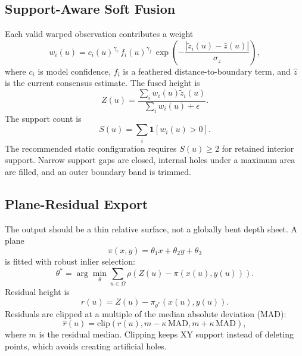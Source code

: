 \documentclass[conference]{IEEEtran}
\begin{document}
\subsection{Support-Aware Soft Fusion}
Each valid warped observation contributes a weight
\begin{equation}
w_i(u)=
c_i(u)^{\gamma_c}\,
f_i(u)^{\gamma_f}\,
\exp\left(-\frac{| \tilde{z}_i(u)-\hat{z}(u)|}{\sigma_z}\right),
\label{eq:fusion_weight}
\end{equation}
where $c_i$ is model confidence, $f_i$ is a feathered distance-to-boundary term, and $\hat{z}$ is the current consensus estimate. The fused height is
\begin{equation}
Z(u)=\frac{\sum_i w_i(u)\tilde{z}_i(u)}{\sum_i w_i(u)+\epsilon}.
\end{equation}
The support count is
\begin{equation}
S(u)=\sum_i \mathbf{1}[w_i(u)>0].
\end{equation}
The recommended static configuration requires $S(u)\ge 2$ for retained interior support. Narrow support gaps are closed, internal holes under a maximum area are filled, and an outer boundary band is trimmed.

\subsection{Plane-Residual Export}
The output should be a thin relative surface, not a globally bent depth sheet. A plane
\begin{equation}
\pi(x,y)=\theta_1 x+\theta_2 y+\theta_3
\end{equation}
is fitted with robust inlier selection:
\begin{equation}
\theta^*=\arg\min_{\theta}\sum_{u\in \Omega} \rho(Z(u)-\pi(x(u),y(u))).
\end{equation}
Residual height is
\begin{equation}
r(u)=Z(u)-\pi_{\theta^*}(x(u),y(u)).
\end{equation}
Residuals are clipped at a multiple of the median absolute deviation (MAD):
\begin{equation}
\hat{r}(u)=\mathrm{clip}(r(u), m-\kappa\,\mathrm{MAD},m+\kappa\,\mathrm{MAD}),
\end{equation}
where $m$ is the residual median. Clipping keeps XY support instead of deleting points, which avoids creating artificial holes.
\end{document}
